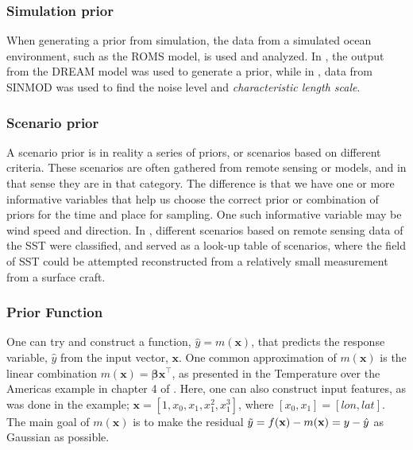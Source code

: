 \subsubsection{Simulation prior}
When generating a prior from simulation, the data from a simulated ocean environment, such as the ROMS model, is used and analyzed. In \cite{berget2018adaptive}, the output from the DREAM model was used to generate a prior, while in \cite{fossum2018information}, data from SINMOD was used to find the noise level and \textit{characteristic length scale}.

\subsubsection{Scenario prior}
A scenario prior is in reality a series of priors, or scenarios based on different criteria. These scenarios are often gathered from remote sensing or models, and in that sense they are in that category. The difference is that we have one or more informative variables that help us choose the correct prior or combination of priors for the time and place for sampling. One such informative variable may be wind speed and direction. In \cite{fossum2020compact}, different scenarios based on remote sensing data of the SST were classified, and served as a look-up table of scenarios, where the field of SST could be attempted reconstructed from a relatively small measurement from a surface craft. 

\subsubsection{Prior Function}
One can try and construct a function, $\hat{y} = m(\mathbf{x})$, that predicts the response variable, $\hat{y}$ from the input vector, $\mathbf{x}$. One common approximation of $m(\mathbf{x})$ is the linear combination $m(\mathbf{x}) = \mathbf{\beta x^{\intercal}}$, as presented in the Temperature over the Americas example in chapter 4 of \cite{cressie2015statistics}. Here, one can also construct input features, as was done in the example; $\mathbf{x} = [1,x_0, x_1,x_1^2, x_1^3]$, where $[x_0,x_1] = [lon,lat]$. The main goal of $m(\mathbf{x})$ is to make the residual $\Tilde{y} = f(\mathbf{x})-m(\mathbf{x})= y-\hat{y}$ as Gaussian as possible. 




